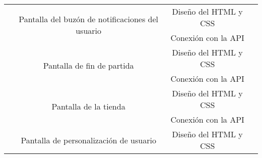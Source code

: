 \documentclass[11pt, a4paper, titlepage]{article}
\begin{document}
\begin{landscape}
\begin{table}[hbt!]
\begin{tabular}{c|ccll|cc|}
\multicolumn{1}{|c|}{}                            & \multicolumn{1}{c|}{\multirow{2}{*}{Pantalla del buzón de notificaciones del usuario}}                          & \multicolumn{3}{c|}{Diseño del HTML y CSS}                                                                     & \multicolumn{2}{c|}{}                                                        \\ \cline{3-5}
\multicolumn{1}{|c|}{}                            & \multicolumn{1}{c|}{}                                                                                           & \multicolumn{3}{c|}{Conexión con la API}                                                                       & \multicolumn{2}{c|}{}                                                        \\ \cline{2-5}
\multicolumn{1}{|c|}{}                            & \multicolumn{1}{c|}{\multirow{2}{*}{Pantalla de fin de partida}}                                                & \multicolumn{3}{c|}{Diseño del HTML y CSS}                                                                     & \multicolumn{2}{c|}{}                                                        \\ \cline{3-5}
\multicolumn{1}{|c|}{}                            & \multicolumn{1}{c|}{}                                                                                           & \multicolumn{3}{c|}{Conexión con la API}                                                                       & \multicolumn{2}{c|}{}                                                        \\ \cline{2-5}
\multicolumn{1}{|c|}{}                            & \multicolumn{1}{c|}{\multirow{2}{*}{Pantalla de la tienda}}                                                     & \multicolumn{3}{c|}{Diseño del HTML y CSS}                                                                     & \multicolumn{2}{c|}{}                                                        \\ \cline{3-5}
\multicolumn{1}{|c|}{}                            & \multicolumn{1}{c|}{}                                                                                           & \multicolumn{3}{c|}{Conexión con la API}                                                                       & \multicolumn{2}{c|}{}                                                        \\ \cline{2-5}
\multicolumn{1}{|c|}{}                            & \multicolumn{1}{c|}{\multirow{2}{*}{Pantalla de personalización de usuario}}                                    & \multicolumn{3}{c|}{Diseño del HTML y CSS}                                                                     & \multicolumn{2}{c|}{}                                                        \\ \cline{3-5}

\end{tabular}
\end{table}
\end{landscape}
\end{document}
